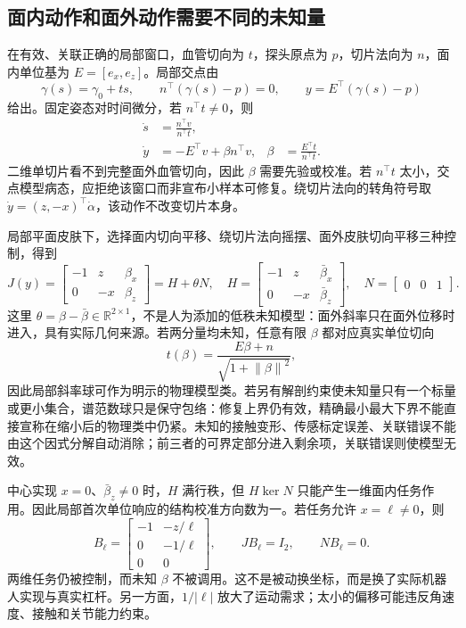 \documentclass[11pt,a4paper]{article}
\numberwithin{equation}{section}
\theoremstyle{definition}
\newcommand{\R}{\mathbb R}
\newcommand{\norm}[1]{\left\lVert#1\right\rVert}
\begin{document}
\subsection{面内动作和面外动作需要不同的未知量}
在有效、关联正确的局部窗口，血管切向为 $t$，探头原点为 $p$，切片法向为 $n$，面内单位基为 $E=[e_x,e_z]$。局部交点由
\begin{equation}
 \gamma(s)=\gamma_0+ts,\qquad
 n^\top(\gamma(s)-p)=0,\qquad
 y=E^\top(\gamma(s)-p)
\end{equation}
给出。固定姿态对时间微分，若 $n^\top t\ne0$，则
\begin{align}
 \dot s&=\frac{n^\top v}{n^\top t},\\
 \dot y&=-E^\top v+\beta n^\top v,
 &\beta&=\frac{E^\top t}{n^\top t}.
\end{align}
二维单切片看不到完整面外血管切向，因此 $\beta$ 需要先验或校准。若 $n^\top t$ 太小，交点模型病态，应拒绝该窗口而非宣布小样本可修复。绕切片法向的转角符号取 $\dot y=(z,-x)^\top\dot\alpha$，该动作不改变切片本身。

局部平面皮肤下，选择面内切向平移、绕切片法向摇摆、面外皮肤切向平移三种控制，得到
\begin{equation}
 J(y)=
 \begin{bmatrix}-1&z&\beta_x\\0&-x&\beta_z\end{bmatrix}
 =H+\theta N,\quad
 H=\begin{bmatrix}-1&z&\bar\beta_x\\0&-x&\bar\beta_z\end{bmatrix},\quad
 N=\begin{bmatrix}0&0&1\end{bmatrix}.
\end{equation}
这里 $\theta=\beta-\bar\beta\in\R^{2\times1}$，不是人为添加的低秩未知模型：面外斜率只在面外位移时进入，具有实际几何来源。若两分量均未知，任意有限 $\beta$ 都对应真实单位切向
\begin{equation}
 t(\beta)=\frac{E\beta+n}{\sqrt{1+\norm{\beta}^2}},
\end{equation}
因此局部斜率球可作为明示的物理模型类。若另有解剖约束使未知量只有一个标量或更小集合，谱范数球只是保守包络：修复上界仍有效，精确最小最大下界不能直接宣称在缩小后的物理类中仍紧。未知的接触变形、传感标定误差、关联错误不能由这个因式分解自动消除；前三者的可界定部分进入剩余项，关联错误则使模型无效。

中心实现 $x=0$、$\bar\beta_z\ne0$ 时，$H$ 满行秩，但 $H\ker N$ 只能产生一维面内任务作用。因此局部首次单位响应的结构校准方向数为一。若任务允许 $x=\ell\ne0$，则
\begin{equation}
 B_\ell=
 \begin{bmatrix}
 -1&-z/\ell\\0&-1/\ell\\0&0
 \end{bmatrix},\qquad
 JB_\ell=I_2,\qquad NB_\ell=0.
\end{equation}
两维任务仍被控制，而未知 $\beta$ 不被调用。这不是被动换坐标，而是换了实际机器人实现与真实杠杆。另一方面，$1/|\ell|$ 放大了运动需求；太小的偏移可能违反角速度、接触和关节能力约束。
\end{document}
